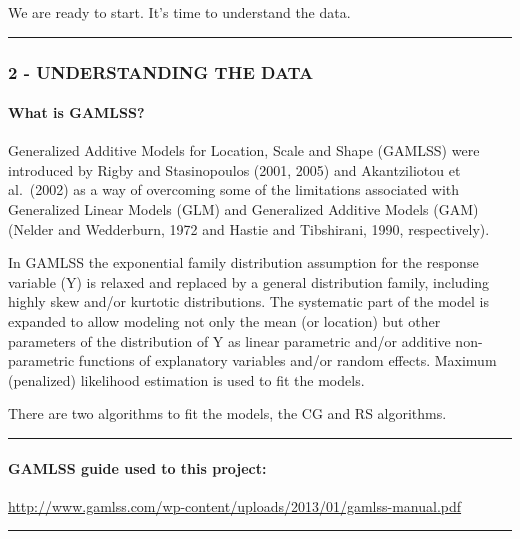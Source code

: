 \documentclass[
]{article}
\begin{document}
We are ready to start. It's time to understand the data.

\begin{center}\rule{0.5\linewidth}{0.5pt}\end{center}

\hypertarget{understanding-the-data}{%
\subsubsection{2 - UNDERSTANDING THE
DATA}\label{understanding-the-data}}

\hypertarget{what-is-gamlss}{%
\paragraph{What is GAMLSS?}\label{what-is-gamlss}}

Generalized Additive Models for Location, Scale and Shape (GAMLSS) were
introduced by Rigby and Stasinopoulos (2001, 2005) and Akantziliotou et
al.~(2002) as a way of overcoming some of the limitations associated
with Generalized Linear Models (GLM) and Generalized Additive Models
(GAM) (Nelder and Wedderburn, 1972 and Hastie and Tibshirani, 1990,
respectively).

In GAMLSS the exponential family distribution assumption for the
response variable (Y) is relaxed and replaced by a general distribution
family, including highly skew and/or kurtotic distributions. The
systematic part of the model is expanded to allow modeling not only the
mean (or location) but other parameters of the distribution of Y as
linear parametric and/or additive non-parametric functions of
explanatory variables and/or random effects. Maximum (penalized)
likelihood estimation is used to fit the models.

There are two algorithms to fit the models, the CG and RS algorithms.

\begin{center}\rule{0.5\linewidth}{0.5pt}\end{center}

\hypertarget{gamlss-guide-used-to-this-project}{%
\paragraph{GAMLSS guide used to this
project:}\label{gamlss-guide-used-to-this-project}}

\url{http://www.gamlss.com/wp-content/uploads/2013/01/gamlss-manual.pdf}

\begin{center}\rule{0.5\linewidth}{0.5pt}\end{center}
\end{document}
